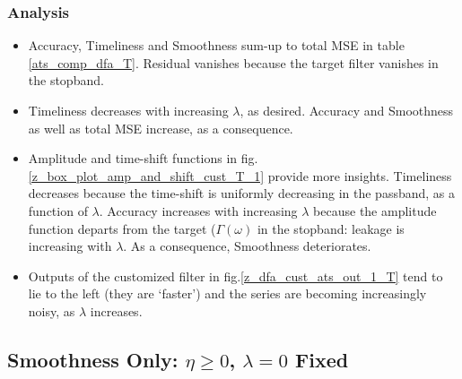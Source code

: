 \documentclass[a4paper]{book}
\begin{document}
\subsubsection{Analysis}
\begin{itemize}
\item Accuracy, Timeliness and Smoothness sum-up to total MSE in table \ref{ats_comp_dfa_T}. Residual vanishes because the target filter vanishes in the stopband.
\item Timeliness decreases with increasing $\lambda$, as desired. Accuracy and Smoothness as well as total MSE increase, as a consequence.
\item Amplitude and time-shift functions in fig.\ref{z_box_plot_amp_and_shift_cust_T_1} provide more insights. Timeliness decreases because the time-shift is uniformly decreasing in the passband, as a function of $\lambda$. Accuracy increases with increasing $\lambda$ because the amplitude function departs from the target ($\Gamma(\omega)$ in the stopband: leakage is increasing with $\lambda$. As a consequence, Smoothness deteriorates. 
\item Outputs of the customized filter in fig.\ref{z_dfa_cust_ats_out_1_T} tend to lie to the left (they are `faster') and the series are becoming increasingly noisy, as $\lambda$ increases.
\end{itemize}


\subsection{Smoothness Only: $\eta\geq 0$, $\lambda=0$ Fixed}\label{smoo_on}
\end{document}
